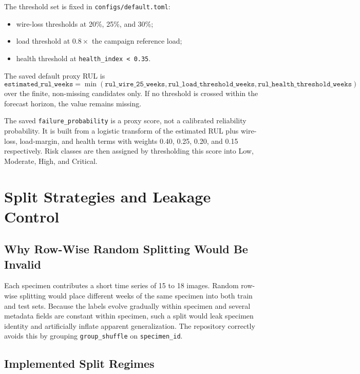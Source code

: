 \documentclass[11pt,a4paper]{article}
\begin{document}
The threshold set is fixed in \texttt{configs/default.toml}:
\begin{itemize}
  \item wire-loss thresholds at 20\%, 25\%, and 30\%;
  \item load threshold at \(0.8 \times\) the campaign reference load;
  \item health threshold at \texttt{health\_index < 0.35}.
\end{itemize}

The saved default proxy RUL is
\[
\texttt{estimated\_rul\_weeks}
= \min\left(
\texttt{rul\_wire\_25\_weeks},
\texttt{rul\_load\_threshold\_weeks},
\texttt{rul\_health\_threshold\_weeks}
\right)
\]
over the finite, non-missing candidates only. If no threshold is crossed within the forecast horizon, the value remains missing.

The saved \texttt{failure\_probability} is a proxy score, not a calibrated reliability probability. It is built from a logistic transform of the estimated RUL plus wire-loss, load-margin, and health terms with weights 0.40, 0.25, 0.20, and 0.15 respectively. Risk classes are then assigned by thresholding this score into Low, Moderate, High, and Critical.

\section{Split Strategies and Leakage Control}

\subsection{Why Row-Wise Random Splitting Would Be Invalid}

Each specimen contributes a short time series of 15 to 18 images. Random row-wise splitting would place different weeks of the same specimen into both train and test sets. Because the labels evolve gradually within specimen and several metadata fields are constant within specimen, such a split would leak specimen identity and artificially inflate apparent generalization. The repository correctly avoids this by grouping \texttt{group\_shuffle} on \texttt{specimen\_id}.

\subsection{Implemented Split Regimes}
\end{document}
